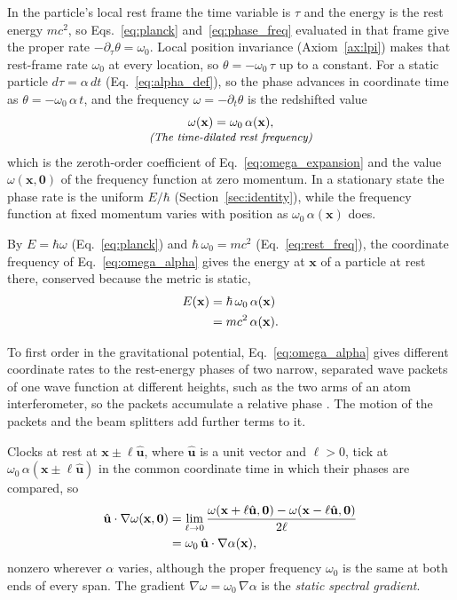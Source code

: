 \documentclass[aps,prd,onecolumn,tightenlines,nofootinbib,notitlepage,11pt,floatfix]{revtex4-2}
\theoremstyle{indentedtheorem}
\begin{document}
In the particle's local rest frame the time variable is $\tau$ and the energy is the rest energy $mc^2$, so Eqs.~\eqref{eq:planck} and~\eqref{eq:phase_freq} evaluated in that frame give the proper rate $-\partial_\tau\theta=\omega_0$. Local position invariance (Axiom~\ref{ax:lpi}) makes that rest-frame rate $\omega_0$ at every location, so $\theta=-\omega_0\,\tau$ up to a constant. For a static particle $d\tau=\alpha\,dt$ (Eq.~\eqref{eq:alpha_def}), so the phase advances in coordinate time as $\theta=-\omega_0\,\alpha\,t$, and the frequency $\omega=-\partial_t\theta$ is the redshifted value
\begin{equation}
    \begin{gathered}
    \omega(\mathbf{x}) = \omega_0\,\alpha(\mathbf{x}) , \\[-3pt]
    \text{\small\itshape (The time-dilated rest frequency)}
    \end{gathered}
    \label{eq:omega_alpha}
\end{equation}
which is the zeroth-order coefficient of Eq.~\eqref{eq:omega_expansion} and the value $\omega(\mathbf{x},\mathbf{0})$ of the frequency function at zero momentum. In a stationary state the phase rate is the uniform $E/\hbar$ (Section~\ref{sec:identity}), while the frequency function at fixed momentum varies with position as $\omega_0\,\alpha(\mathbf{x})$ does.

By $E=\hbar\omega$ (Eq.~\eqref{eq:planck}) and $\hbar\,\omega_0=mc^2$ (Eq.~\eqref{eq:rest_freq}), the coordinate frequency of Eq.~\eqref{eq:omega_alpha} gives the energy at $\mathbf{x}$ of a particle at rest there, conserved because the metric is static,
\begin{align}
    E(\mathbf{x}) &= \hbar \, \omega_0 \, \alpha(\mathbf{x}) \notag\\
    &= mc^2 \, \alpha(\mathbf{x}) .
    \label{eq:energy_alpha_massive}
\end{align}

To first order in the gravitational potential, Eq.~\eqref{eq:omega_alpha} gives different coordinate rates to the rest-energy phases of two narrow, separated wave packets of one wave function at different heights, such as the two arms of an atom interferometer, so the packets accumulate a relative phase \citep{Asenbaum2017Phase}. The motion of the packets and the beam splitters add further terms to it.

Clocks at rest at $\mathbf{x}\pm\ell\hat{\mathbf{u}}$, where $\hat{\mathbf{u}}$ is a unit vector and $\ell>0$, tick at $\omega_0\,\alpha(\mathbf{x}\pm\ell\hat{\mathbf{u}})$ in the common coordinate time in which their phases are compared, so
\begin{align}
    \hat{\mathbf{u}}\cdot\nabla\omega(\mathbf{x},\mathbf{0}) &= \lim_{\ell\to0}\frac{\omega(\mathbf{x}+\ell\hat{\mathbf{u}},\mathbf{0})-\omega(\mathbf{x}-\ell\hat{\mathbf{u}},\mathbf{0})}{2\ell} \notag\\
    &= \omega_0\,\hat{\mathbf{u}}\cdot\nabla\alpha(\mathbf{x}) ,
    \label{eq:gradient_span}
\end{align}
nonzero wherever $\alpha$ varies, although the proper frequency $\omega_0$ is the same at both ends of every span. The gradient $\nabla\omega=\omega_0\,\nabla\alpha$ is the \emph{static spectral gradient}.
\end{document}
